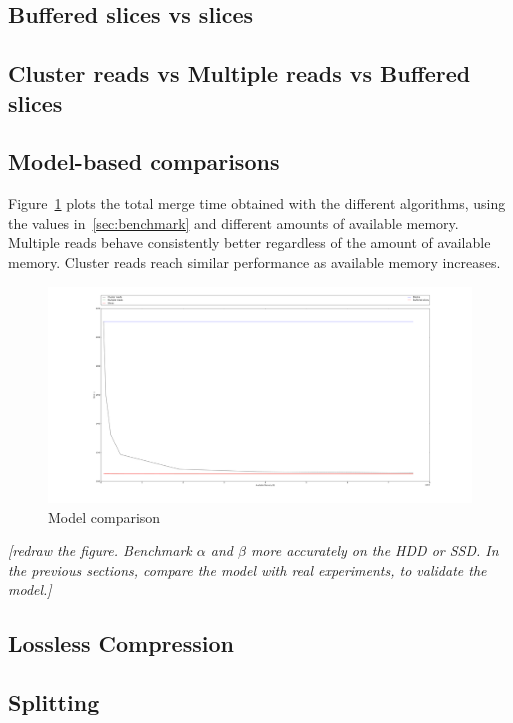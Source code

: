 \documentclass[10pt, conference, compsocconf]{IEEEtran}
\newcommand{\todo}[1]{
  \color{red}\emph{[#1]}
  \color{black}
}
\begin{document}
\subsection{Buffered slices vs slices}


\subsection{Cluster reads vs Multiple reads vs Buffered slices}

\subsection{Model-based comparisons}

Figure~\ref{fig:models} plots the total merge time obtained with the
different algorithms, using the values in~\ref{sec:benchmark} and
different amounts of available memory. Multiple reads behave
consistently better regardless of the amount of available
memory. Cluster reads reach similar performance as available memory
increases.
\begin{figure}
  \includegraphics[width=\columnwidth]{figures/model.pdf}
  \caption{Model comparison}
  \label{fig:models}
\end{figure}
\todo{redraw the figure. Benchmark $\alpha$ and $\beta$ more
  accurately on the HDD or SSD. In the previous sections, compare the
  model with real experiments, to validate the model.}

\subsection{Lossless Compression}

\subsection{Splitting}
\end{document}
